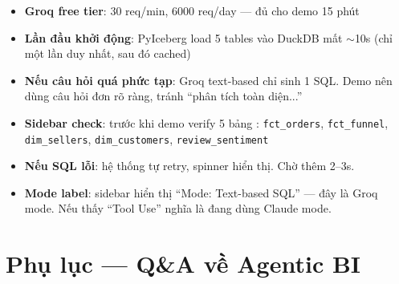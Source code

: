 \documentclass[12pt, a4paper]{article}
\begin{document}
\vspace{1em}

\begin{tcolorbox}[colback=yellow!8, colframe=orange!60, arc=4pt,
  title={\faExclamationTriangle\ Lưu ý khi demo}]
\begin{itemize}[leftmargin=1.5em, itemsep=4pt]
  \item \textbf{Groq free tier}: 30 req/min, 6000 req/day --- đủ cho demo 15 phút
  \item \textbf{Lần đầu khởi động}: PyIceberg load 5 tables vào DuckDB mất $\sim$10s
        (chỉ một lần duy nhất, sau đó cached)
  \item \textbf{Nếu câu hỏi quá phức tạp}: Groq text-based chỉ sinh 1 SQL.
        Demo nên dùng câu hỏi đơn rõ ràng, tránh ``phân tích toàn diện...''
  \item \textbf{Sidebar check}: trước khi demo verify 5 bảng \textcolor{green!60!black}{\faCheckCircle}:
        \texttt{fct\_orders}, \texttt{fct\_funnel}, \texttt{dim\_sellers},
        \texttt{dim\_customers}, \texttt{review\_sentiment}
  \item \textbf{Nếu SQL lỗi}: hệ thống tự retry, spinner hiển thị. Chờ thêm 2--3s.
  \item \textbf{Mode label}: sidebar hiển thị ``Mode: Text-based SQL'' --- đây là Groq mode.
        Nếu thấy ``Tool Use'' nghĩa là đang dùng Claude mode.
\end{itemize}
\end{tcolorbox}

\section{Phụ lục — Q\&A về Agentic BI}
\end{document}

